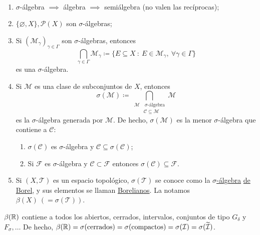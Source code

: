 \begin{eg}~
	\begin{enumerate}
		\item $\sigma$-álgebra $\implies$ álgebra $\implies$ semiálgebra (no valen las recíprocas);

		\item $\{\varnothing,X\},\mathcal{P}(X)$ son $\sigma$-álgebras;

		\item Si $(\mathscr{M}_{\gamma})_{\gamma \in \Gamma}$ son $\sigma$-álgebras, entonces
		\[ \displaystyle\bigcap_{\gamma\in\Gamma} \mathscr{M}_{\gamma} \coloneq \{ E \subseteq X \ : \ E \in \mathscr{M}_{\gamma},\ \forall \gamma \in \Gamma \} \]
		es una $\sigma$-álgebra.
		
		\item Si $\mathscr{M}$ es una clase de subconjuntos de $X$, entonces
		\[ \sigma(\mathscr{M}) \coloneq \displaystyle\bigcap_{\begin{aligned}
			\mathscr{M}& \ \sigma\text{-álgebra} \\
			& \mathscr{C}\subseteq\mathscr{M}
		\end{aligned}} \mathscr{M} \]
		es la $\sigma$-álgebra generada por $\mathscr{M}$. De hecho, $\sigma(\mathscr{M})$ es la menor $\sigma$-álgebra que contiene a $\mathscr{C}$:
		\begin{enumerate}
			\item $\sigma(\mathscr{C})$ es $\sigma$-álgebra y $\mathscr{C} \subseteq \sigma(\mathscr{C})$;

			\item Si $\mathscr{F}$ es $\sigma$-álgebra y $\mathscr{C} \subset \mathscr{F}$ entonces $\sigma(\mathscr{C}) \subseteq \mathscr{F}$.
		\end{enumerate}

		\item Si $(X,\mathscr{T})$ es un espacio topológico, $\sigma(\mathscr{T})$ se conoce como la \underline{$\sigma$-álgebra} \underline{de Borel}, y sus elementos se llaman \underline{Borelianos}. La notamos $\beta(X)\ (= \sigma(\mathscr{T}))$.
	\end{enumerate}
\end{eg}
	
\begin{eg}
	$\beta(\mathbb{R})$ contiene a todos los abiertos, cerrados, intervalos, conjuntos de tipo $G_{\delta}$ y $F_{\sigma},\dots$ De hecho, $\beta(\mathbb{R})=\sigma(\text{cerrados})=\sigma(\text{compactos})=\sigma(\mathcal{I})=\sigma(\widetilde{\mathcal{I}})$.
\end{eg}

